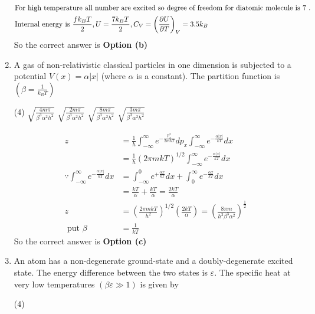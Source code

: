 \begin{enumerate}
\begin{answer}
	\begin{align*}
	\intertext{For high temperature all number are excited so degree of freedom for diatomic molecule is 7 .}
	\text{Internal energy is }\frac{f k_{B} T}{2}, U&=\frac{7 k_{B} T}{2}, C_{V}=\left(\frac{\partial U}{\partial T}\right)_{V}=3.5 k_{B}
	\end{align*}
	So the correct answer is \textbf{Option (b)}
\end{answer}
	\item A gas of non-relativistic classical particles in one dimension is subjected to a potential $V(x)=\alpha|x|$ (where $\alpha$ is a constant). The partition function is $\left(\beta=\frac{1}{k_{B} T}\right)$
	{}
	\begin{tasks}(4)
		\task[\textbf{a.}] $\sqrt{\frac{4 m \pi}{\beta^{3} \alpha^{2} h^{2}}}$
		\task[\textbf{b.}] $\sqrt{\frac{2 m \pi}{\beta^{3} \alpha^{2} h^{2}}}$
		\task[\textbf{c.}] $\sqrt{\frac{8 m \pi}{\beta^{3} \alpha^{2} h^{2}}}$
		\task[\textbf{d.}] $\sqrt{\frac{3 m \pi}{\beta^{3} \alpha^{2} h^{2}}}$
	\end{tasks}
\begin{answer}
	\begin{align*}
	z&=\frac{1}{h} \int_{-\infty}^{\infty} e^{-\frac{p_{x}^{2}}{2 m k T}} d p_{x} \int_{-\infty}^{\infty} e^{-\frac{\alpha|x|}{k T}} d x\\&=\frac{1}{h}(2 \pi m k T)^{1 / 2} \int_{-\infty}^{\infty} e^{-\frac{\alpha|x|}{k T}} d x\\
	\because \int_{-\infty}^{\infty} e^{-\frac{\alpha|x|}{k T}} d x&=\int_{-\infty}^{0} e^{+\frac{\alpha x}{k T}} d x+\int_{0}^{\infty} e^{-\frac{\alpha x}{k T}} d x\\&=\frac{k T}{\alpha}+\frac{k T}{\alpha}=\frac{2 k T}{\alpha}\\
	z&=\left(\frac{2 \pi m k T}{h^{2}}\right)^{1 / 2}\left(\frac{2 k T}{\alpha}\right)=\left(\frac{8 \pi m}{h^{2} \beta^{3} \alpha^{2}}\right)^{\frac{1}{2}}\\
	\text{ put }\beta&=\frac{1}{k T}
	\end{align*}
	So the correct answer is \textbf{Option (c)}
\end{answer}
	\item An atom has a non-degenerate ground-state and a doubly-degenerate excited state. The energy difference between the two states is $\varepsilon$. The specific heat at very low temperatures $(\beta \varepsilon \gg 1)$ is given by
	{}
	\begin{tasks}(4)

\end{tasks}
\end{enumerate}
